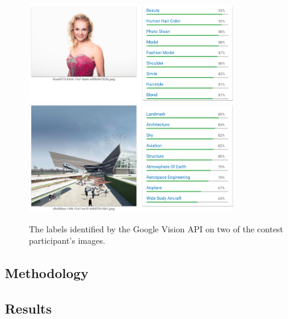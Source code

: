     \begin{figure}[h] 
		\begin{center}
            \includegraphics[width=0.8\textwidth]{images/google_vision_labels.png}
            \includegraphics[width=0.8\textwidth]{images/google_vision_labels2.png}
			\caption{The labels identified by the Google Vision API on two of the contest participant's images.}
			\label{google_vision_labels}
		\end{center}
	\end{figure}

\subsection{Methodology}

\subsection{Results}
